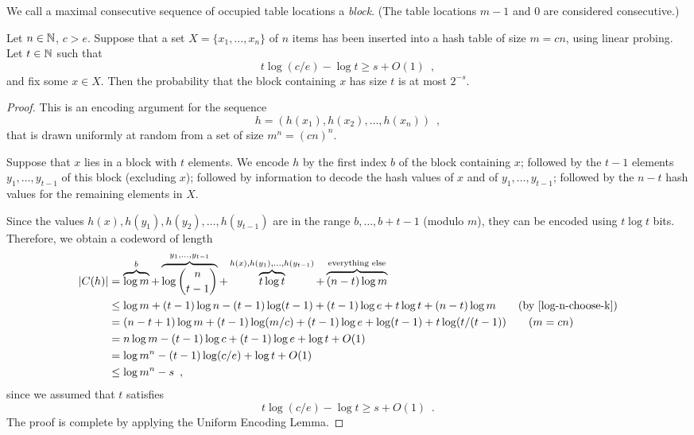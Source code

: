 \documentclass{patmorin}
\newcommand{\aremark}[3]{\textcolor{blue}{\textsc{#1 #2:}}
  \textcolor{red}{\textsf{#3}}}
\newcommand{\wolfgang}[2][says]{\aremark{Wolfgang}{#1}{#2}}
\begin{document}
We call a maximal consecutive sequence of occupied table locations a
\emph{block}. (The table locations $m-1$ and $0$ are considered
consecutive.)

\begin{thm}
  Let $n \in \mathbb{N}$, $c > e$.
  Suppose that a set $X = \{x_1, \dots, x_n\}$ of $n$ items 
  has been inserted into a hash table of size $m = cn$, using linear 
  probing.
  Let $t \in \mathbb{N}$ such that
  \[
    t \log (c/e) - \log t \ge s + O(1) \enspace ,
  \]
  and fix some $x\in X$. 
  Then the probability that the block containing
  $x$ has size $t$
  is at most $2^{-s}$.
\end{thm}

\begin{proof}
  This is an encoding argument for 
  the sequence
  \[
    h = (h(x_1),h(x_2),\ldots,h(x_n)) \enspace ,
  \]
  that is drawn uniformly at random from a set of size
  $m^n = (cn)^n$.
  
  Suppose that $x$ lies in a block with $t$ elements.
  We encode $h$ by the first index $b$ of the block containing $x$;
  followed by the $t-1$ elements $y_1,\dots,y_{t-1}$ of this block
  (excluding $x$); followed by information to decode the hash
  values of $x$ and of $y_1,\dots,y_{t-1}$; followed by
  the $n-t$ hash values for the remaining elements in $X$.

  Since the values $h(x),h(y_1),h(y_2),\ldots,h(y_{t-1})$ are in the range
  $b,\ldots,b+t-1$ (modulo $m$), they can be encoded using
  $t\log t$ bits.  Therefore, 
  we obtain a codeword of length 
  \begin{align*}
    |C(h)| & = \overbrace{\log m}^{b} + \overbrace{\log\binom{n}{t-1}}^{y_1,\ldots,y_{t-1}} + \overbrace{t\log t}^{h(x),h(y_1),\ldots,h(y_{t-1})} + \overbrace{(n-t)\log m}^{\text{everything else}} \\
           & \le \log m + (t-1)\log n - 
             (t-1)\log(t-1) + (t-1)\log e + t\log t + (n-t)\log m \tag{by \eqref{log-n-choose-k}}\\
	  &=
         (n-t+1)\log m + (t-1)\log (m/c) + (t-1)\log e + \log (t-1)+ t\log(t/(t-1)) \tag{$m = cn$}\\
           & = n\log m - (t-1)\log c + (t-1)\log e + \log t + O(1) \\
           & = \log m^n - (t-1)\log(c/e) + \log t + O(1) \\
           & \le \log m^n - s \enspace ,
  \end{align*}
  since we assumed that $t$ satisfies
  \[
    t \log (c/e) - \log t \ge s + O(1) \enspace .
  \]
  The proof is complete by applying the Uniform Encoding Lemma.
\end{proof}
\end{document}
